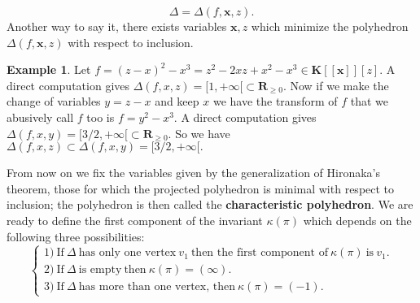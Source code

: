 \documentclass[11pt, a4paper]{amsart}
\numberwithin{equation}{section}
\theoremstyle{plain}
\theoremstyle{definition}
\newtheorem{Ex}[Thm]{Example}
\theoremstyle{remark}
\newcommand{\K}{\mathbf{K}}
\newcommand{\0}{{\boldsymbol 0}}
\newcommand{\x}{{\boldsymbol x}}
\begin{document}
$$\Delta= \Delta(f,\x,z).$$
Another way to say it, there exists variables $\x,z$ which minimize the polyhedron $\Delta(f,\x,z)$ with respect to inclusion.

\begin{Ex}Let $f=(z-x)^2-x^3= z^2-2xz+x^2-x^3 \in \K[[\x]][z].$
A direct computation gives $\Delta(f,x,z)=[1,+\infty[ \subset \mathbf{R}_{\geq 0}.$ Now if we make the change of variables $y=z-x$ and keep $x$ we have the transform of $f$ that we abusively call $f$ too is $f=y^2-x^3.$ A direct computation gives $\Delta(f,x,y)=[3/2,+\infty[ \subset \mathbf{R}_{\geq 0}.$ So we have $\Delta(f,x,z) \subset \Delta(f,x,y)=[3/2,+\infty[.$  

\end{Ex}
From now on we fix the variables given by the generalization of Hironaka's theorem, those for which the projected polyhedron is minimal with respect to inclusion; the polyhedron is then called the \textbf{characteristic polyhedron}. We are ready to define the first component of the invariant $\kappa(\pi)$ which depends on the following three possibilities:
$$\left \{
    \begin{array}{ll}
      1)~ \mbox{If}~\Delta~ \mbox{has only one vertex}~ v_1~ \mbox{then the first component of}~\kappa(\pi)~\mbox{is}~ v_1. \\
      2) ~\mbox{If}~\Delta~ \mbox{is empty}~ \mbox{then}~\kappa(\pi)=(\infty). \\
    3) ~\mbox{If}~\Delta~ \mbox{has more than one vertex, then}~ \kappa(\pi)=(-1).
    \end{array}
    \right.
     $$
     
\end{document}
